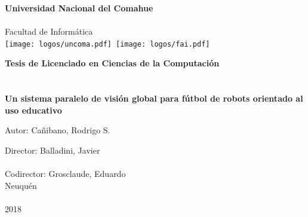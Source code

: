 
\titlepage

\begin{center}
\ \\
\ \\
\vspace{-1cm}


\ \\

\vspace{0.5cm}
{\Large{\bf \sc Universidad Nacional del Comahue}}\\

\ \\
{\Large { \sc Facultad de Informática}}\\

\vspace{-2.5cm}
\mbox{\hspace{-1cm}\texttt{[image: logos/uncoma.pdf]}\hspace{13cm} \texttt{[image: logos/fai.pdf]}}


\vspace{6cm}

{\Large {\bf\sc Tesis de Licenciado en Ciencias de la Computación}}\\
\ \\
\ \\
{\LARGE {\bf Un sistema paralelo de visión global para fútbol de robots
	orientado al uso educativo}}\\
\vspace{3cm}

{\Large Autor: Cañibano, Rodrigo S.}\\
\vspace{2cm}

{\Large Director: Balladini, Javier}\\
\ \\
{\Large Codirector: Grosclaude, Eduardo}\\

\vfill
{\Large {\sc Neuquén}\hspace{6cm}{\sc Argentina}}\\
\ \\

{\Large 2018}\\

\end{center}

\pagebreak

